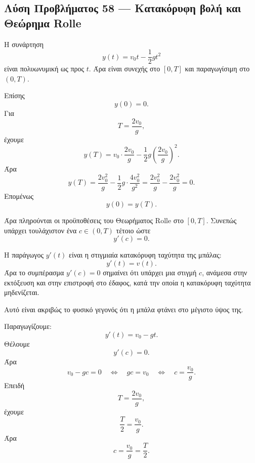 \subsection*{Λύση Προβλήματος 58 --- Κατακόρυφη βολή και Θεώρημα Rolle}

\begin{alist}
  \item Η συνάρτηση
        \[
          y(t)=v_0t-\frac12gt^2
        \]
        είναι πολυωνυμική ως προς \(t\). Άρα είναι συνεχής στο
        \([0,T]\) και παραγωγίσιμη στο \((0,T)\).

        Επίσης
        \[
          y(0)=0.
        \]
        Για
        \[
          T=\frac{2v_0}{g},
        \]
        έχουμε
        \[
          y(T)
          =
          v_0\cdot\frac{2v_0}{g}
          -
          \frac12g\left(\frac{2v_0}{g}\right)^2.
        \]
        Άρα
        \[
          y(T)
          =
          \frac{2v_0^2}{g}
          -
          \frac12g\cdot\frac{4v_0^2}{g^2}
          =
          \frac{2v_0^2}{g}
          -
          \frac{2v_0^2}{g}
          =
          0.
        \]
        Επομένως
        \[
          y(0)=y(T).
        \]

        Άρα πληρούνται οι προϋποθέσεις του Θεωρήματος Rolle στο
        \([0,T]\). Συνεπώς υπάρχει τουλάχιστον ένα
        \(c\in(0,T)\) τέτοιο ώστε
        \[
          y'(c)=0.
        \]

  \item Η παράγωγος \(y'(t)\) είναι η στιγμιαία κατακόρυφη ταχύτητα της
        μπάλας:
        \[
          y'(t)=v(t).
        \]
        Άρα το συμπέρασμα \(y'(c)=0\) σημαίνει ότι υπάρχει μια στιγμή
        \(c\), ανάμεσα στην εκτόξευση και στην επιστροφή στο έδαφος, κατά
        την οποία η κατακόρυφη ταχύτητα μηδενίζεται.

        Αυτό είναι ακριβώς το φυσικό γεγονός ότι η μπάλα φτάνει στο
        μέγιστο ύψος της.

  \item Παραγωγίζουμε:
        \[
          y'(t)=v_0-gt.
        \]
        Θέλουμε
        \[
          y'(c)=0.
        \]
        Άρα
        \[
          v_0-gc=0
          \quad\Longleftrightarrow\quad
          gc=v_0
          \quad\Longleftrightarrow\quad
          c=\frac{v_0}{g}.
        \]
        Επειδή
        \[
          T=\frac{2v_0}{g},
        \]
        έχουμε
        \[
          \frac{T}{2}=\frac{v_0}{g}.
        \]
        Άρα
        \[
          {c=\frac{v_0}{g}=\frac{T}{2}}.
        \]
\end{alist}

